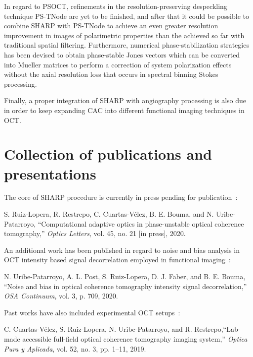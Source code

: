 In regard to PSOCT, refinements in the resolution-preserving despeckling technique  PS-TNode are yet to be finished, and after that it could be possible to combine SHARP with PS-TNode to achieve an even greater resolution improvement in images of polarimetric properties than the achieved so far with traditional spatial filtering. Furthermore, numerical phase-stabilization strategies has been devised to obtain phase-stable Jones vectors which can be converted into Mueller matrices to perform a correction of system polarization effects without the axial resolution loss that occurs in spectral binning Stokes processing.

Finally, a proper integration of SHARP with angiography processing is also due in order to keep expanding CAC into different functional imaging techniques in OCT.

\section{Collection of publications and presentations}

The core of SHARP procedure is currently in press pending for publication~\cite{Ruiz-Lopera2020_Computational}:

S. Ruiz-Lopera, R. Restrepo, C. Cuartas-Vélez, B. E. Bouma, and N. Uribe-Patarroyo, ``Computational adaptive optics in phase-unstable optical coherence tomography,'' \textit{Optics Letters}, vol. 45, no. 21 [in press], 2020.

An additional work has been published in regard to noise and bias analysis in OCT intensity based signal decorrelation employed in functional imaging~\cite{Uribe-Patarroyo2020_Noise}:

N. Uribe-Patarroyo, A. L. Post, S. Ruiz-Lopera, D. J. Faber, and B. E. Bouma, ``Noise and bias in optical coherence tomography intensity signal decorrelation,'' \textit{OSA Continuum}, vol. 3, p. 709, 2020.

Past works have also included experimental OCT setups~\cite{Cuartas-Velez2019_Labmade, Ruiz-Lopera2018_Design}:

C. Cuartas-Vélez, S. Ruiz-Lopera, N. Uribe-Patarroyo, and R. Restrepo,``Lab-made accessible full-field optical coherence tomography imaging system,'' \textit{Optica Pura y Aplicada}, vol. 52, no. 3, pp. 1–11, 2019.

